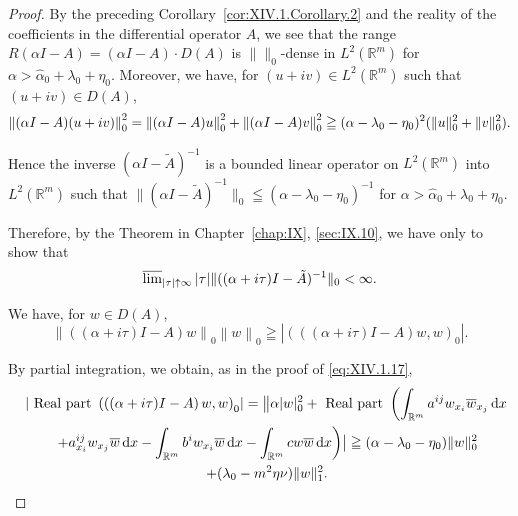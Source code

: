 \begin{proof}
 By the preceding Corollary~\ref{cor:XIV.1.Corollary.2} and the reality of the coefficients in the differential operator $A$, we see that the range $R(\alpha I - A) = (\alpha I - A) \cdot D(A)$ is $\|\|_0$-dense in $L^2(\mathbb{R}^{m})$ for $\alpha > \hat{\alpha}_0 + \lambda_0 + \eta_0$. Moreover, we have, for $(u + iv) \in L^2(\mathbb{R}^{m})$ such that $(u + iv) \in D(A)$, 
\begin{equation}\left\| (\alpha I - A) (u + i v) \right\| _{0} ^{2} = \left\| (\alpha I - A) u \right\| _{0} ^{2} + \left\| (\alpha I - A) v \right\| _{0} ^{2} \geqq (\alpha - \lambda_{0} - \eta_{0}) ^{2} (\| u \| _{0} ^{2} + \| v \| _{0} ^{2}). \notag\end{equation}

Hence the inverse $(\alpha I - \tilde{A})^{-1}$ is a bounded linear operator on $L^2 (\mathbb{R}^{m})$ into $L^2 (\mathbb{R}^{m})$ such that $\|(\alpha I - \tilde{A})^{-1}\|_0 \leqq (\alpha - \lambda_0 - \eta_0)^{-1}$ for $\alpha > \hat{\alpha}_0 + \lambda_0 + \eta_0$. 

Therefore, by the Theorem in Chapter~\ref{chap:IX}, \ref{sec:IX.10}, we have only to show that 
\begin{equation}\label{eq:XIV.1.20}
\varlimsup\limits_{| \tau | \uparrow \infty} | \tau | \| ((\alpha + i \tau) I - \tilde {A}) ^{-1} \| _{0} < \infty .
\end{equation}

We have, for $w \in D(A)$, 
\begin{equation}\label{eq:XIV.1.21}
\left\| ((\alpha + i \tau) I - A) w \right\| _{0} \left\| w \right\| _{0} \geqq \left| \left(\left((\alpha + i \tau) I - A\right) w, w\right) _{0} \right|.
\end{equation}

By partial integration, we obtain, as in the proof of \eqref{eq:XIV.1.17}, 
\begin{gather}\quad \left| \text{ Real part } \left(\left((\alpha + i \tau) I - A\right) w, w\right) _{0} \right| = \bigl\| \alpha | w | _{0} ^{2} + \text{ Real part } \left(\int_ {\mathbb{R}^{m}} a ^{ij} w _ {x _{i}} \overline {{w}} _ {x _{j}} \dd x \right.
\\\quad \left. + a _ {x _{i}} ^{ij} w _ {x _{j}} \overline {{w}} \dd x - \int_ {\mathbb{R}^{m}} b ^{i} w _ {x _{i}} \overline {{w}} \dd x - \int_ {\mathbb{R}^{m}} c w \overline {{w}} \dd x\right) \bigr| \geqq (\alpha - \lambda_{0} - \eta_{0}) \| w \| _{0} ^{2} \notag
\\\quad + (\lambda_{0} - m ^{2} \eta \nu) \| w \| _{1} ^{2}. \notag
\end{gather}


\end{proof}
